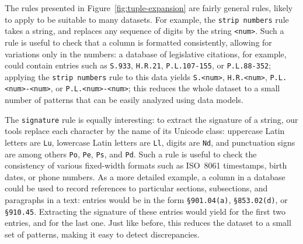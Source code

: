The rules presented in Figure~\ref{fig:tuple-expansion} are fairly general rules, likely to apply to be suitable to many datasets. For example, the \texttt{strip numbers} rule takes a string, and replaces any sequence of digits by the string \texttt{<num>}. Such a rule is useful to check that a column is formatted consistently, allowing for variations only in the numbers: a database of legislative citations, for example, could contain entries such as \texttt{S.933}, \texttt{H.R.21}, \texttt{P.L.107-155}, or \texttt{P.L.88-352}; applying the \texttt{strip numbers} rule to this data yields \texttt{S.<num>}, \texttt{H.R.<num>}, \texttt{P.L.<num>-<num>}, or \texttt{P.L.<num>-<num>}; this reduces the whole dataset to a small number of patterns that can be easily analyzed using data models.

The \texttt{signature} rule is equally interesting: to extract the signature of a string, our tools replace each character by the name of its Unicode class: uppercase Latin letters are \texttt{Lu}, lowercase Latin letters are \texttt{Ll}, digits are \texttt{Nd}, and punctuation signs are among others \texttt{Po}, \texttt{Pe}, \texttt{Ps}, and \texttt{Pd}. Such a rule is useful to check the consistency of various fixed-width formats such as ISO~8061 timestamps, birth dates, or phone numbers. As a more detailed example, a column in a database could be used to record references to particular sections, subsections, and paragraphs in a text: entries would be in the form \texttt{\S901.04(a)}, \texttt{\S853.02(d)}, or \texttt{\S910.45}. Extracting the signature of these entries would yield  for the first two entries, and  for the last one. Just like before, this reduces the dataset to a small set of patterns, making it easy to detect discrepancies. %

